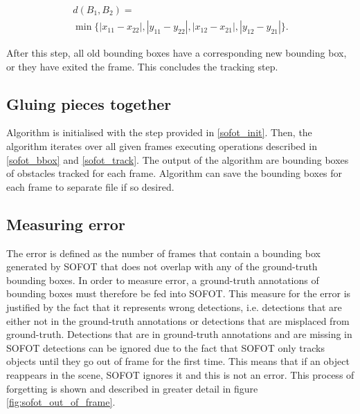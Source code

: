 \documentclass[10pt,twocolumn,letterpaper]{article}
\begin{document}
\begin{multline}
   d(B_1, B_2) =\\ \min\{ |x_{11} - x_{22}|, |y_{11} - y_{22}|, |x_{12} - x_{21}|, |y_{12} - y_{21}| \}.
\end{multline}

After this step, all old bounding boxes have a corresponding new bounding box, or they have exited the frame.
This concludes the tracking step.

\subsection{Gluing pieces together}

Algorithm is initialised with the step provided in \ref{sofot_init}. Then, the algorithm
iterates over all given frames executing operations described in \ref{sofot_bbox} and \ref{sofot_track}.
The output of the algorithm are bounding boxes of obstacles tracked for each frame. Algorithm
can save the bounding boxes for each frame to separate file if so desired.

\subsection{Measuring error}

The error is defined as the number of frames that contain a bounding box generated by SOFOT that
does not overlap with any of the ground-truth bounding boxes.
In order to measure error, a ground-truth annotations of bounding boxes must therefore be fed into SOFOT.
This measure for the error is justified by the fact that it represents wrong detections, i.e. detections
that are either not in the ground-truth annotations or detections that are misplaced from ground-truth.
Detections that are in ground-truth annotations and are missing in SOFOT detections can be ignored
due to the fact that SOFOT only tracks objects until they go out of frame for the first time. This means
that if an object reappears in the scene, SOFOT ignores it and this is not an error. This process of forgetting
is shown and described in greater detail in figure \ref{fig:sofot_out_of_frame}.
\end{document}
